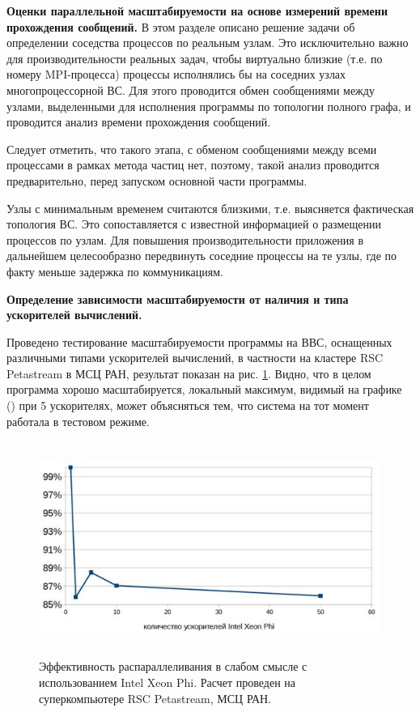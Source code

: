 \textbf{Оценки параллельной масштабируемости на основе измерений времени прохождения сообщений.}
В этом разделе описано решение задачи об определении соседства процессов по реальным узлам. Это исключительно важно для производительности реальных задач, чтобы виртуально близкие (т.е. по номеру MPI-процесса) процессы исполнялись бы на соседних узлах многопроцессорной ВС. Для этого проводится обмен сообщениями между узлами, выделенными 
для исполнения программы по топологии полного графа, и проводится анализ времени прохождения сообщений.  

Следует отметить, что такого этапа, с обменом сообщениями между всеми процессами в рамках метода частиц нет, поэтому, такой анализ проводится предварительно, перед запуском основной части программы.



Узлы с минимальным временем считаются близкими, т.е. выясняется фактическая топология ВС. Это сопоставляется с известной информацией о размещении процессов по узлам.	Для повышения производительности приложения в дальнейшем целесообразно передвинуть соседние процессы на те узлы, где по факту меньше задержка по коммуникациям.




\textbf{Определение зависимости масштабируемости от наличия и типа ускорителей вычислений.}

Проведено тестирование масштабируемости программы на ВВС, оснащенных различными типами ускорителей вычислений, в частности на кластере RSC Petastream в МСЦ РАН, результат показан на рис. \ref{phi100}. Видно, что в целом программа хорошо масштабируется, локальный максимум, видимый на графике () при 5 ускорителях, может объясняться тем, что система на тот момент работала в тестовом режиме.

\begin{figure}[htb]
	\begin{center}
		\includegraphics[height=7cm,keepaspectratio]{images/petastream_phi100.jpg}
	\end{center}
	\caption{Эффективность распараллеливания в слабом смысле с использованием Intel Xeon Phi. Расчет проведен на суперкомпьютере RSC Petastream, МСЦ РАН.}
	\label{phi100}
\end{figure}

